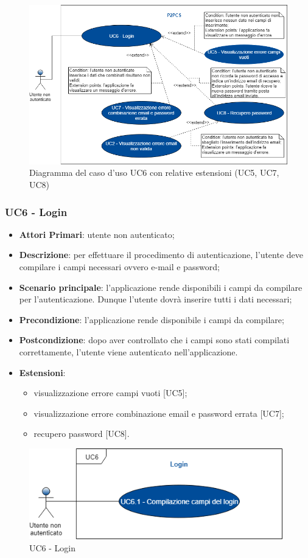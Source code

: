 \begin{figure}[h]
	\includegraphics[width=16cm]{res/images/Schemagenerale2.png}
	\centering
	\caption{Diagramma del caso d'uso UC6 con relative estensioni (UC5, UC7, UC8)}
\end{figure}
\newpage
\subsubsection{UC6 - Login}
\begin{itemize}
	\item \textbf{Attori Primari}: utente non autenticato;
	\item \textbf{Descrizione}: per effettuare il procedimento di autenticazione, l'utente deve compilare i campi necessari ovvero e-mail e password;
	\item \textbf{Scenario principale}: l'applicazione rende disponibili i campi da compilare per l'autenticazione. Dunque l'utente dovrà inserire tutti i dati necessari;
	\item \textbf{Precondizione}: l'applicazione rende disponibile i campi da compilare;
	\item \textbf{Postcondizione}: dopo aver controllato che i campi sono stati compilati correttamente, l'utente viene autenticato nell'applicazione.
	\item \textbf{Estensioni}:
		\begin{itemize}
			\item visualizzazione errore campi vuoti [UC5];
			\item visualizzazione errore combinazione email e password errata [UC7];
			\item recupero password [UC8].
		\end{itemize}	
\end{itemize}
\begin{figure}[h]
	\includegraphics[width=11cm]{res/images/UC6Login.png}
	\centering
	\caption{UC6 - Login}
\end{figure}
\newpage
